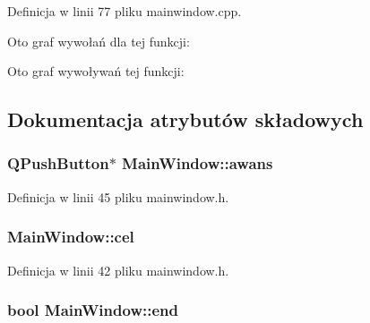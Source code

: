 \-Definicja w linii 77 pliku mainwindow.\-cpp.



\-Oto graf wywołań dla tej funkcji\-:




\-Oto graf wywoływań tej funkcji\-:




\subsection{\-Dokumentacja atrybutów składowych}
\hypertarget{class_main_window_ade2329ceab4efd7401816607726fb57f}{
\subsubsection[{awans}]{\setlength{\rightskip}{0pt plus 5cm}\-Q\-Push\-Button$\ast$ {\bf \-Main\-Window\-::awans}}}\label{class_main_window_ade2329ceab4efd7401816607726fb57f}


\-Definicja w linii 45 pliku mainwindow.\-h.

\hypertarget{class_main_window_a283ff2015ce02067caf95ef460be3ff9}{
\subsubsection[{cel}]{ {\bf \-Main\-Window\-::cel}}}\label{class_main_window_a283ff2015ce02067caf95ef460be3ff9}


\-Definicja w linii 42 pliku mainwindow.\-h.

\hypertarget{class_main_window_a24823a731fbd97181b314763bd491e50}{
\subsubsection[{end}]{\setlength{\rightskip}{0pt plus 5cm}bool {\bf \-Main\-Window\-::end}}}\label{class_main_window_a24823a731fbd97181b314763bd491e50}


